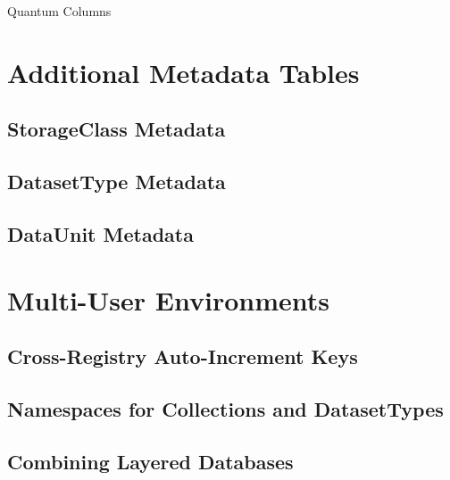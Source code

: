 \documentclass[DM,toc]{lsstdoc}
\newcommand{\coltable}[1]{
    \begin{table}
        {\footnotesize
        }
        \caption{#1 Columns}
        \label{tbl:#1}
    \end{table}
}
\begin{document}
\coltable{Quantum}

\section{Additional Metadata Tables}
\label{sec:additional-metadata-tables}

\subsection{StorageClass Metadata}
\label{sec:storageclass-metadata}

\subsection{DatasetType Metadata}
\label{sec:datasettype-metadata}

\subsection{DataUnit Metadata}
\label{sec:dataunit-metadata}


\section{Multi-User Environments}
\label{sec:multi-user-environments}

\subsection{Cross-Registry Auto-Increment Keys}
\label{sec:cross-registry-auto-increment-keys}

\subsection{Namespaces for Collections and DatasetTypes}
\label{sec:namespaces-for-collections-and-datasettypes}

\subsection{Combining Layered Databases}
\label{sec:layered-databases}
\end{document}

